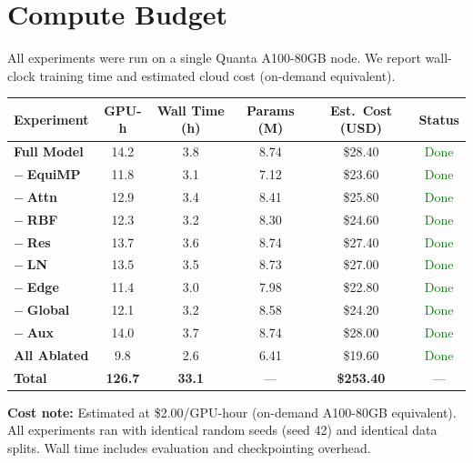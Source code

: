 \section{Compute Budget}

All experiments were run on a single Quanta A100-80GB node. We report wall-clock
training time and estimated cloud cost (on-demand equivalent).

\vspace{6pt}

{\footnotesize
\renewcommand{\arraystretch}{1.25}
\begin{tabularx}{\textwidth}{@{}>{\bfseries}l c c c c c@{}}
\toprule
\rowcolor{accent!6}
Experiment & GPU-h & Wall Time (h) & Params (M) & Est.\ Cost (USD) & Status \\
\midrule
Full Model           & 14.2 & 3.8  & 8.74 & \$28.40 & \textcolor{green}{Done} \\
\rowcolor{slatebg}
\(-\;\)EquiMP         & 11.8 & 3.1  & 7.12 & \$23.60 & \textcolor{green}{Done} \\
\(-\;\)Attn           & 12.9 & 3.4  & 8.41 & \$25.80 & \textcolor{green}{Done} \\
\rowcolor{slatebg}
\(-\;\)RBF            & 12.3 & 3.2  & 8.30 & \$24.60 & \textcolor{green}{Done} \\
\(-\;\)Res            & 13.7 & 3.6  & 8.74 & \$27.40 & \textcolor{green}{Done} \\
\rowcolor{slatebg}
\(-\;\)LN             & 13.5 & 3.5  & 8.73 & \$27.00 & \textcolor{green}{Done} \\
\(-\;\)Edge           & 11.4 & 3.0  & 7.98 & \$22.80 & \textcolor{green}{Done} \\
\rowcolor{slatebg}
\(-\;\)Global         & 12.1 & 3.2  & 8.58 & \$24.20 & \textcolor{green}{Done} \\
\(-\;\)Aux            & 14.0 & 3.7  & 8.74 & \$28.00 & \textcolor{green}{Done} \\
\rowcolor{redlight!20}
All Ablated          &  9.8 & 2.6  & 6.41 & \$19.60 & \textcolor{green}{Done} \\
\midrule
\rowcolor{slatebg!70}
\textbf{Total}       & \textbf{126.7} & \textbf{33.1} & --- & \textbf{\$253.40} & --- \\
\bottomrule
\end{tabularx}
}

\vspace{4pt}

\begin{calloutbox}
  \textbf{\color{accent}\faInfoCircle\; Cost note:} Estimated at \$2.00/GPU-hour
  (on-demand A100-80GB equivalent). All experiments ran with identical random seeds
  (seed 42) and identical data splits. Wall time includes evaluation and checkpointing
  overhead.
\end{calloutbox}

